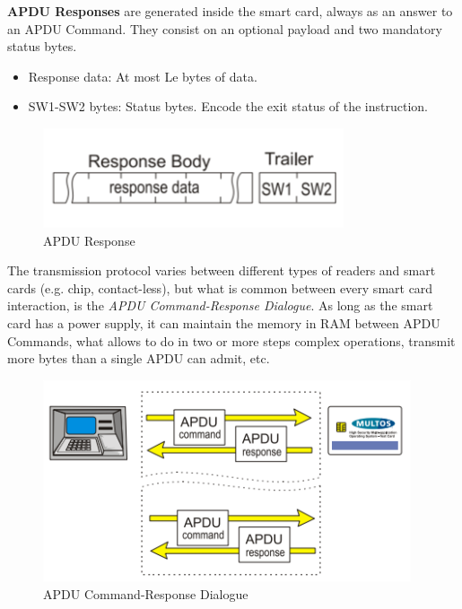 \textbf{APDU Responses} are generated inside the smart card, always as an answer to an APDU Command. They consist on an optional payload and two mandatory status bytes.


\begin{itemize}
	\item Response data: At most Le bytes of data.
	\item SW1-SW2 bytes: Status bytes. Encode the exit status of the instruction.
\end{itemize}

\begin{figure}[bth]
	\begin{center}
		\includegraphics[width=0.55\linewidth]{gfx/APDUResponse}
	\end{center}
	\caption{APDU Response}
	\label{fig:APDUResponse}
\end{figure}




\hfil


The transmission protocol varies between different types of readers and smart cards (e.g. chip, contact-less), but what is common between every smart card interaction, is the \textit{APDU Command-Response Dialogue}. As long as the smart card has a power supply, it can maintain the memory in RAM between APDU Commands, what allows to do in two or more steps complex operations, transmit more bytes than a single APDU can admit, etc.

\hfil




\begin{figure}[bth]
	\begin{center}
		\includegraphics[width=0.75\linewidth]{gfx/APDUdialog}
	\end{center}
	\caption{APDU Command-Response Dialogue}
	\label{fig:APDUdialog}
\end{figure}

